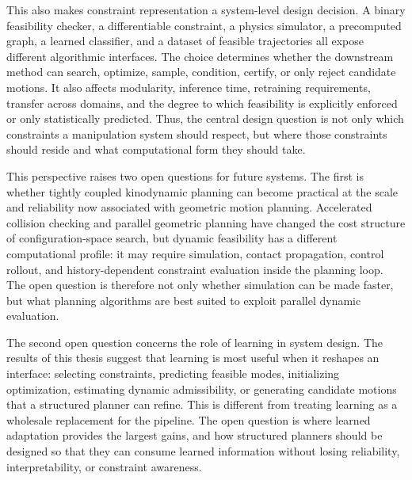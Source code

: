 This also makes constraint representation a system-level design decision.
A binary feasibility checker, a differentiable constraint, a physics simulator, a precomputed graph, a learned classifier, and a dataset of feasible trajectories all expose different algorithmic interfaces.
The choice determines whether the downstream method can search, optimize, sample, condition, certify, or only reject candidate motions.
It also affects modularity, inference time, retraining requirements, transfer across domains, and the degree to which feasibility is explicitly enforced or only statistically predicted.
Thus, the central design question is not only which constraints a manipulation system should respect, but where those constraints should reside and what computational form they should take.

This perspective raises two open questions for future systems.
The first is whether tightly coupled kinodynamic planning can become practical at the scale and reliability now associated with geometric motion planning.
Accelerated collision checking and parallel geometric planning have changed the cost structure of configuration-space search, but dynamic feasibility has a different computational profile: it may require simulation, contact propagation, control rollout, and history-dependent constraint evaluation inside the planning loop.
The open question is therefore not only whether simulation can be made faster, but what planning algorithms are best suited to exploit parallel dynamic evaluation.

The second open question concerns the role of learning in system design.
The results of this thesis suggest that learning is most useful when it reshapes an interface: selecting constraints, predicting feasible modes, initializing optimization, estimating dynamic admissibility, or generating candidate motions that a structured planner can refine.
This is different from treating learning as a wholesale replacement for the pipeline.
The open question is where learned adaptation provides the largest gains, and how structured planners should be designed so that they can consume learned information without losing reliability, interpretability, or constraint awareness.


